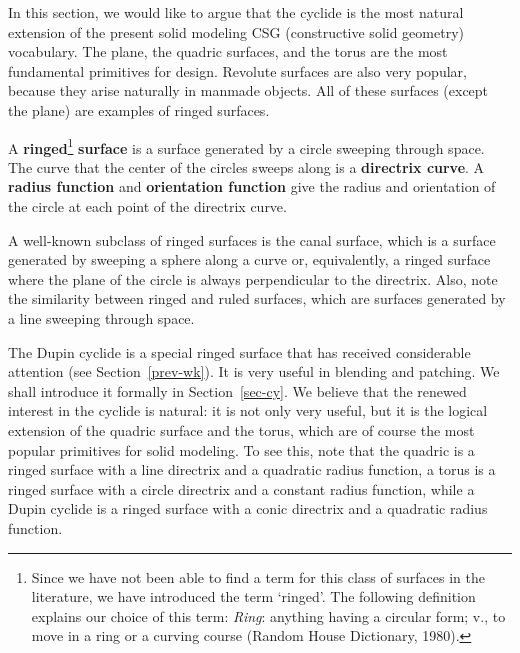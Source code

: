 In this section, we would like to argue that the 
cyclide is the most natural extension of the present solid modeling
CSG (constructive solid geometry) vocabulary.
The plane, the quadric surfaces, and the torus are the most fundamental
primitives for design.
Revolute surfaces are also very popular, because they arise naturally
in manmade objects.
All of these surfaces (except the plane) are examples of ringed surfaces.

\begin{defn2}
\label{ringed}
A {\bf ringed}\footnote{
	Since we have not been able to find a term for this class of surfaces
	in the literature, we have introduced the term `ringed'.
	The following definition explains our choice of this term:
	{\em Ring}: anything having a circular form; v.,
	to move in a ring or a curving course (Random House Dictionary, 1980).}
{\bf surface} %
is a surface generated by a circle sweeping through space.
The curve that the center of the circles sweeps along is 
a {\bf directrix curve}.
A {\bf radius function} and {\bf orientation function} 
give the radius and orientation of the circle at each point of the
directrix curve.
\end{defn2}

\begin{rmk}
A well-known subclass of ringed surfaces is the canal surface, 
which is a surface generated by sweeping a sphere along a curve
or, equivalently, a ringed surface where the 
plane of the circle is always perpendicular to the directrix.
Also, note the similarity between ringed and ruled surfaces, 
which are surfaces generated by a line sweeping through space.
\end{rmk}

The Dupin cyclide is a special ringed surface that has received
considerable attention (see Section~\ref{prev-wk}).
It is very useful in blending and patching.
We shall introduce it formally in Section~\ref{sec-cy}.
We believe that the renewed interest in the cyclide is natural:
it is not only very useful, but it is the logical extension
of the quadric surface and the torus, which are of course the most
popular primitives for solid modeling.
To see this, note that the quadric is a ringed surface with
a line directrix and a quadratic radius function, 
a torus is a ringed surface with a circle directrix and a constant
radius function, 
while a Dupin cyclide is a ringed surface with a conic directrix 
and a quadratic radius function.

